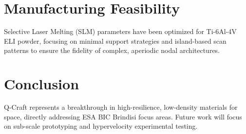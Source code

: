 \documentclass[11pt]{report}
\begin{document}
\chapter{Manufacturing Feasibility}
Selective Laser Melting (SLM) parameters have been optimized for Ti-6Al-4V ELI powder, focusing on minimal support strategies and island-based scan patterns to ensure the fidelity of complex, aperiodic nodal architectures.

\chapter{Conclusion}
Q-Craft represents a breakthrough in high-resilience, low-density materials for space, directly addressing ESA BIC Brindisi focus areas. Future work will focus on sub-scale prototyping and hypervelocity experimental testing.
\end{document}
